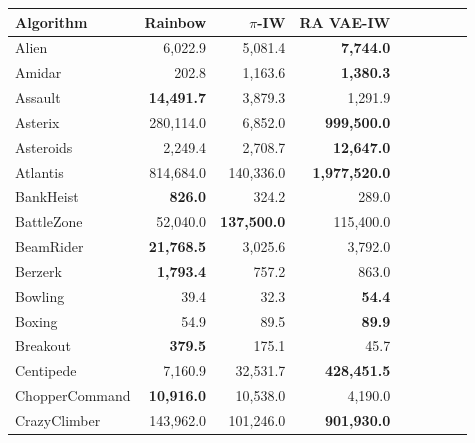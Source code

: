 \begin{table}[ht]
\begin{center}
\begin{small}
\begin{tabular}{lrrrrrrrl}
\toprule
Algorithm & Rainbow & $\pi$-IW & RA VAE-IW \\


\midrule

Alien            & 6,022.9                 & 5,081.4                 & \textbf{7,744.0}     \\
Amidar           & 202.8                   & 1,163.6                 & \textbf{1,380.3}     \\
Assault          & \textbf{14,491.7}       & 3,879.3                 & 1,291.9              \\
Asterix          & 280,114.0               & 6,852.0                 & \textbf{999,500.0}   \\
Asteroids        & 2,249.4                 & 2,708.7                 & \textbf{12,647.0}    \\
Atlantis         & 814,684.0               & 140,336.0               & \textbf{1,977,520.0} \\
BankHeist        & \textbf{826.0}          & 324.2                   & 289.0                \\
BattleZone       & 52,040.0                & \textbf{137,500.0}      & 115,400.0            \\
BeamRider        & \textbf{21,768.5}       & 3,025.6                 & 3,792.0              \\
Berzerk          & \textbf{1,793.4}        & 757.2                   & 863.0                \\
Bowling          & 39.4                    & 32.3                    & \textbf{54.4}        \\
Boxing           & 54.9                    & 89.5                    & \textbf{89.9}        \\
Breakout         & \textbf{379.5}          & 175.1                   & 45.7                 \\
Centipede        & 7,160.9                 & 32,531.7                & \textbf{428,451.5}   \\
ChopperCommand   & \textbf{10,916.0}       & 10,538.0                & 4,190.0              \\
CrazyClimber     & 143,962.0               & 101,246.0               & \textbf{901,930.0}   \\

\end{tabular}
\end{small}
\end{center}
\end{table}
